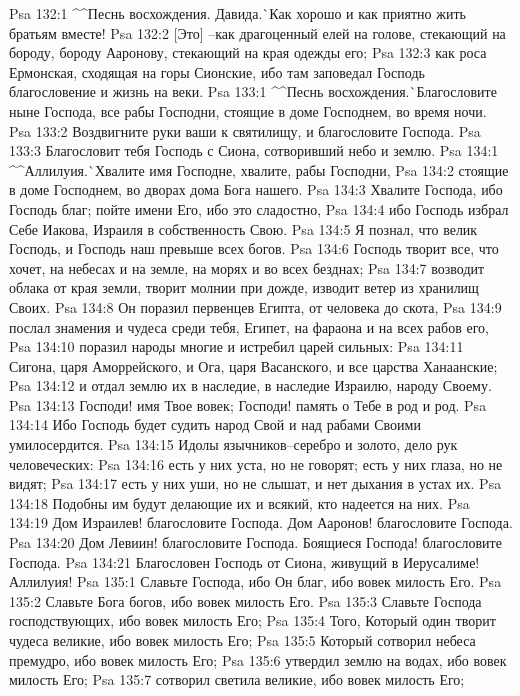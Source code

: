 Psa 132:1  ^^Песнь восхождения. Давида.^^ Как хорошо и как приятно жить братьям вместе!
Psa 132:2  [Это] --как драгоценный елей на голове, стекающий на бороду, бороду Ааронову, стекающий на края одежды его;
Psa 132:3  как роса Ермонская, сходящая на горы Сионские, ибо там заповедал Господь благословение и жизнь на веки.
Psa 133:1  ^^Песнь восхождения.^^ Благословите ныне Господа, все рабы Господни, стоящие в доме Господнем, во время ночи.
Psa 133:2  Воздвигните руки ваши к святилищу, и благословите Господа.
Psa 133:3  Благословит тебя Господь с Сиона, сотворивший небо и землю.
Psa 134:1  ^^Аллилуия.^^ Хвалите имя Господне, хвалите, рабы Господни,
Psa 134:2  стоящие в доме Господнем, во дворах дома Бога нашего.
Psa 134:3  Хвалите Господа, ибо Господь благ; пойте имени Его, ибо это сладостно,
Psa 134:4  ибо Господь избрал Себе Иакова, Израиля в собственность Свою.
Psa 134:5  Я познал, что велик Господь, и Господь наш превыше всех богов.
Psa 134:6  Господь творит все, что хочет, на небесах и на земле, на морях и во всех безднах;
Psa 134:7  возводит облака от края земли, творит молнии при дожде, изводит ветер из хранилищ Своих.
Psa 134:8  Он поразил первенцев Египта, от человека до скота,
Psa 134:9  послал знамения и чудеса среди тебя, Египет, на фараона и на всех рабов его,
Psa 134:10  поразил народы многие и истребил царей сильных:
Psa 134:11  Сигона, царя Аморрейского, и Ога, царя Васанского, и все царства Ханаанские;
Psa 134:12  и отдал землю их в наследие, в наследие Израилю, народу Своему.
Psa 134:13  Господи! имя Твое вовек; Господи! память о Тебе в род и род.
Psa 134:14  Ибо Господь будет судить народ Свой и над рабами Своими умилосердится.
Psa 134:15  Идолы язычников--серебро и золото, дело рук человеческих:
Psa 134:16  есть у них уста, но не говорят; есть у них глаза, но не видят;
Psa 134:17  есть у них уши, но не слышат, и нет дыхания в устах их.
Psa 134:18  Подобны им будут делающие их и всякий, кто надеется на них.
Psa 134:19  Дом Израилев! благословите Господа. Дом Ааронов! благословите Господа.
Psa 134:20  Дом Левиин! благословите Господа. Боящиеся Господа! благословите Господа.
Psa 134:21  Благословен Господь от Сиона, живущий в Иерусалиме! Аллилуия!
Psa 135:1  Славьте Господа, ибо Он благ, ибо вовек милость Его.
Psa 135:2  Славьте Бога богов, ибо вовек милость Его.
Psa 135:3  Славьте Господа господствующих, ибо вовек милость Его;
Psa 135:4  Того, Который один творит чудеса великие, ибо вовек милость Его;
Psa 135:5  Который сотворил небеса премудро, ибо вовек милость Его;
Psa 135:6  утвердил землю на водах, ибо вовек милость Его;
Psa 135:7  сотворил светила великие, ибо вовек милость Его;
